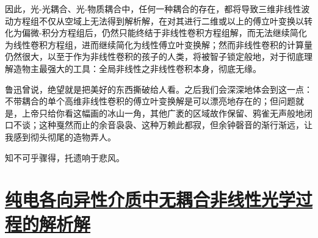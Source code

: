 因此，光-光耦合、光-物质耦合中，任何一种耦合的存在，都将导致三维非线性波动方程组不仅从空域上无法得到解析解，在对其进行二维或以上的傅立叶变换以转化为偏微-积分方程组后，仍然只能终结于非线性卷积方程组解，而无法继续简化为线性卷积方程组，进而继续简化为线性傅立叶变换解；然而非线性卷积的计算量仍然很大，以至于作为非线性卷积的孩子的人类，将被智子锁定般地，对于彻底理解造物主最强大的工具：全局非线性之非线性卷积本身，彻底无缘。

鲁迅曾说，绝望就是把美好的东西撕破给人看。之后我们会深深地体会到这一点：不带耦合的单个高维非线性卷积的傅立叶变换解是可以漂亮地存在的；但问题就是，上帝只给你看这幅画的冰山一角，其他广袤的区域故作保留、鸦雀无声般地闭口不谈；这种戛然而止的余音袅袅、这种万赖此都寂，但余钟磬音的渐行渐远，让我感到彻头彻尾的造物弄人。

知不可乎骤得，托遗响于悲风。

%

\section{\protect\hyperlink{chap:\thesection}{纯电各向异性介质中无耦合非线性光学过程的解析解}}
\label{纯电各向异性介质中无耦合非线性光学过程的解析解}


